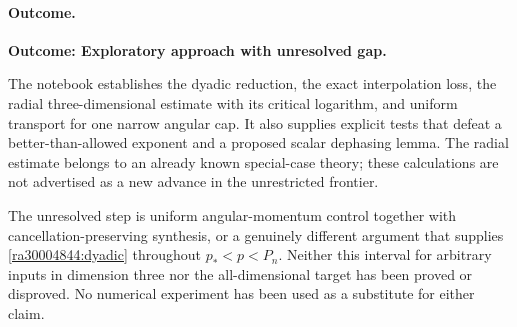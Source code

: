 \documentclass[11pt]{article}
\begin{document}
	\paragraph{Outcome.}
	\textbf{Outcome: Exploratory approach with unresolved gap.}
	
	The notebook establishes the dyadic reduction, the exact interpolation
	loss, the radial three-dimensional estimate with its critical logarithm,
	and uniform transport for one narrow angular cap. It also supplies
	explicit tests that defeat a better-than-allowed exponent and a proposed
	scalar dephasing lemma. The radial estimate belongs to an already known
	special-case theory; these calculations are not advertised as a new
	advance in the unrestricted frontier.
	
	The unresolved step is uniform angular-momentum control together with
	cancellation-preserving synthesis, or a genuinely different argument
	that supplies \eqref{ra30004844:dyadic} throughout
	$p_*<p<P_n$. Neither this interval for arbitrary inputs in dimension
	three nor the all-dimensional target has been proved or disproved.
	No numerical experiment has been used as a substitute for either claim.
\end{document}
